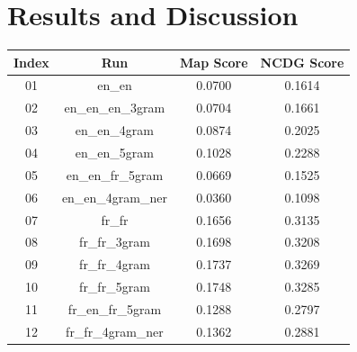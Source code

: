 \section{Results and Discussion}
\label{sec:results}


\begin{center}
    \begin{tabular}{ |c|c||c|c| } 
        \hline
        \textbf{Index} & \textbf{Run} & \textbf{Map Score} & \textbf{NCDG Score}\\
        \hline\hline
        01 & en\_en & \cellcolor{red!30!white}0.0700 & \cellcolor{red!30!white}0.1614 \\
        \hline
        02 & en\_en\_en\_3gram & 0.0704 & 0.1661 \\
        \hline
        03 & en\_en\_4gram & 0.0874 & 0.2025 \\
        \hline
        04 & en\_en\_5gram & 0.1028 & 0.2288 \\
        \hline
        05 & en\_en\_fr\_5gram & \cellcolor{red!60!white}0.0669 & \cellcolor{red!60!white}0.1525 \\
        \hline
        06 & en\_en\_4gram\_ner & \cellcolor{red}0.0360 & \cellcolor{red}0.1098 \\
        \hline
        07 & fr\_fr & 0.1656 & 0.3135 \\
        \hline
        08 & fr\_fr\_3gram & \cellcolor{green!30!white}0.1698 & \cellcolor{green!30!white}0.3208 \\
        \hline
        09 & fr\_fr\_4gram & \cellcolor{green!60!white}0.1737 & \cellcolor{green!60!white}0.3269 \\
        \hline
        10 & fr\_fr\_5gram & \cellcolor{green}0.1748 & \cellcolor{green}0.3285 \\
        \hline
        11 & fr\_en\_fr\_5gram & 0.1288 & 0.2797 \\
        \hline
        12 & fr\_fr\_4gram\_ner & 0.1362 & 0.2881 \\
        \hline
    \end{tabular}
\end{center}

